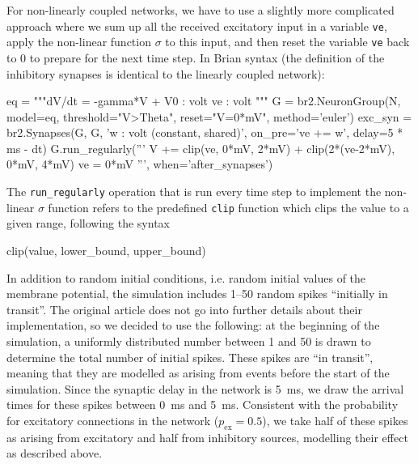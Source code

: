 \documentclass[10pt,a4paper,onecolumn]{article}
\begin{document}
For non-linearly coupled networks, we have to use a slightly more complicated approach where we sum up all the received excitatory input in a variable \verb|ve|, apply the non-linear function $\sigma$ to this input, and then reset the variable \verb|ve| back to 0 to prepare for the next time step. In Brian syntax (the definition of the inhibitory synapses is identical to the linearly coupled network):
\begin{code}
eq = """dV/dt = -gamma*V + V0 : volt
        ve : volt
     """
G = br2.NeuronGroup(N, model=eq, threshold="V>Theta",
                    reset="V=0*mV", method='euler')
exc_syn = br2.Synapses(G, G, 'w : volt (constant, shared)',
                       on_pre='ve += w', delay=5 * ms - dt)
G.run_regularly('''
                V += clip(ve, 0*mV, 2*mV) + clip(2*(ve-2*mV), 0*mV, 4*mV)
                ve = 0*mV
                ''', when='after_synapses')
\end{code}
The \verb|run_regularly| operation that is run every time step to implement the non-linear $\sigma$ function refers to the predefined \verb|clip| function which clips the value to a given range, following the syntax
\begin{code}
clip(value, lower_bound, upper_bound)
\end{code}

In addition to random initial conditions, i.e. random initial values of the membrane potential, the simulation includes 1--50 random spikes ``initially in transit''. The original article does not go into further details about their implementation, so we decided to use the following: at the beginning of the simulation, a uniformly distributed number between 1 and 50 is drawn to determine the total number of initial spikes. These spikes are ``in transit'', meaning that they are modelled as arising from events before the start of the simulation. Since the synaptic delay in the network is \SI{5}{\milli\second}, we draw the arrival times for these spikes between \SI{0}{\milli\second} and \SI{5}{\milli\second}. Consistent with the probability for excitatory connections in the network ($p_\text{ex}=0.5$), we take half of these spikes as arising from excitatory and half from inhibitory sources, modelling their effect as described above.
\end{document}
